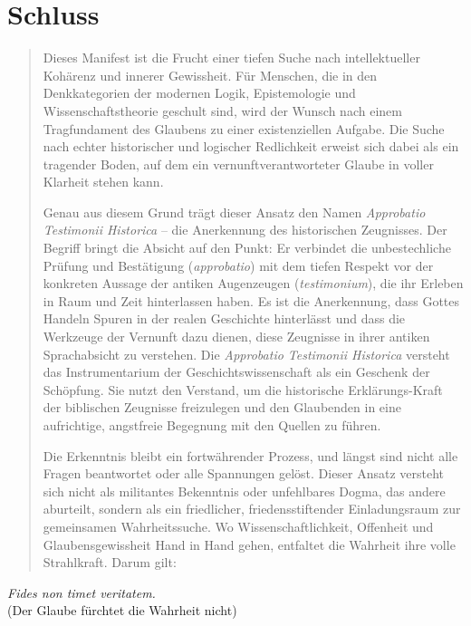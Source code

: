\documentclass[11pt,a4paper]{article}
\begin{document}
\begin{minipage}{\textwidth}
\section*{Schluss}
\begin{quote}
Dieses Manifest ist die Frucht einer tiefen Suche nach intellektueller Kohärenz und innerer Gewissheit. Für Menschen, die in den Denkkategorien der modernen Logik, Epistemologie und Wissenschaftstheorie geschult sind, wird der Wunsch nach einem Tragfundament des Glaubens zu einer existenziellen Aufgabe. Die Suche nach echter historischer und logischer Redlichkeit erweist sich dabei als ein tragender Boden, auf dem ein vernunftverantworteter Glaube in voller Klarheit stehen kann.  

Genau aus diesem Grund trägt dieser Ansatz den Namen \textit{Approbatio Testimonii Historica} – die Anerkennung des historischen Zeugnisses. Der Begriff bringt die Absicht auf den Punkt: Er verbindet die unbestechliche Prüfung und Bestätigung (\textit{approbatio}) mit dem tiefen Respekt vor der konkreten Aussage der antiken Augenzeugen (\textit{testimonium}), die ihr Erleben in Raum und Zeit hinterlassen haben. Es ist die Anerkennung, dass Gottes Handeln Spuren in der realen Geschichte hinterlässt und dass die Werkzeuge der Vernunft dazu dienen, diese Zeugnisse in ihrer antiken Sprachabsicht zu verstehen.  Die \textit{Approbatio Testimonii Historica} versteht das Instrumentarium der Geschichtswissenschaft als ein Geschenk der Schöpfung. Sie nutzt den Verstand, um die historische Erklärungs-Kraft der biblischen Zeugnisse freizulegen und den Glaubenden in eine aufrichtige, angstfreie Begegnung mit den Quellen zu führen.

Die Erkenntnis bleibt ein fortwährender Prozess, und längst sind nicht alle Fragen beantwortet oder alle Spannungen gelöst. Dieser Ansatz versteht sich nicht als militantes Bekenntnis oder unfehlbares Dogma, das andere aburteilt, sondern als ein friedlicher, friedensstiftender Einladungsraum zur gemeinsamen Wahrheitssuche. Wo Wissenschaftlichkeit, Offenheit und Glaubensgewissheit Hand in Hand gehen, entfaltet die Wahrheit ihre volle Strahlkraft. Darum gilt:
\end{quote}

\begin{center}
{\large\itshape Fides non timet veritatem.}\\[0.3em]
{\small (Der Glaube fürchtet die Wahrheit nicht)}
\end{center}


\end{minipage}
\end{document}
